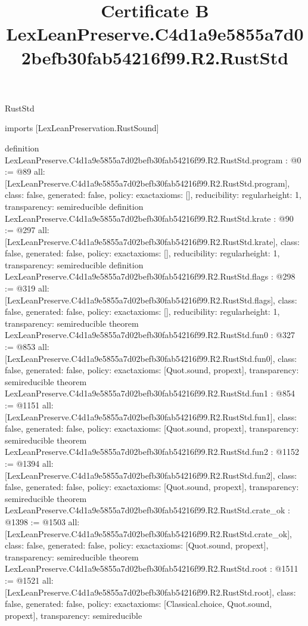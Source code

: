 \begin{lexlean}{RustStd}
\title{Certificate B LexLeanPreserve.C4d1a9e5855a7d02befb30fab54216f99.R2.RustStd}
\begin{coremodule}
imports [LexLeanPreservation.RustSound]

definition LexLeanPreserve.C4d1a9e5855a7d02befb30fab54216f99.R2.RustStd.program : @0 := @89 {
  all: [LexLeanPreserve.C4d1a9e5855a7d02befb30fab54216f99.R2.RustStd.program],
  class: false,
  generated: false,
  policy: exact{axioms: []},
  reducibility: regular{height: 1},
  transparency: semireducible
}
definition LexLeanPreserve.C4d1a9e5855a7d02befb30fab54216f99.R2.RustStd.krate : @90 := @297 {
  all: [LexLeanPreserve.C4d1a9e5855a7d02befb30fab54216f99.R2.RustStd.krate],
  class: false,
  generated: false,
  policy: exact{axioms: []},
  reducibility: regular{height: 1},
  transparency: semireducible
}
definition LexLeanPreserve.C4d1a9e5855a7d02befb30fab54216f99.R2.RustStd.flags : @298 := @319 {
  all: [LexLeanPreserve.C4d1a9e5855a7d02befb30fab54216f99.R2.RustStd.flags],
  class: false,
  generated: false,
  policy: exact{axioms: []},
  reducibility: regular{height: 1},
  transparency: semireducible
}
theorem LexLeanPreserve.C4d1a9e5855a7d02befb30fab54216f99.R2.RustStd.fun0 : @327 := @853 {
  all: [LexLeanPreserve.C4d1a9e5855a7d02befb30fab54216f99.R2.RustStd.fun0],
  class: false,
  generated: false,
  policy: exact{axioms: [Quot.sound, propext]},
  transparency: semireducible
}
theorem LexLeanPreserve.C4d1a9e5855a7d02befb30fab54216f99.R2.RustStd.fun1 : @854 := @1151 {
  all: [LexLeanPreserve.C4d1a9e5855a7d02befb30fab54216f99.R2.RustStd.fun1],
  class: false,
  generated: false,
  policy: exact{axioms: [Quot.sound, propext]},
  transparency: semireducible
}
theorem LexLeanPreserve.C4d1a9e5855a7d02befb30fab54216f99.R2.RustStd.fun2 : @1152 := @1394 {
  all: [LexLeanPreserve.C4d1a9e5855a7d02befb30fab54216f99.R2.RustStd.fun2],
  class: false,
  generated: false,
  policy: exact{axioms: [Quot.sound, propext]},
  transparency: semireducible
}
theorem LexLeanPreserve.C4d1a9e5855a7d02befb30fab54216f99.R2.RustStd.crate_ok : @1398 := @1503 {
  all: [LexLeanPreserve.C4d1a9e5855a7d02befb30fab54216f99.R2.RustStd.crate_ok],
  class: false,
  generated: false,
  policy: exact{axioms: [Quot.sound, propext]},
  transparency: semireducible
}
theorem LexLeanPreserve.C4d1a9e5855a7d02befb30fab54216f99.R2.RustStd.root : @1511 := @1521 {
  all: [LexLeanPreserve.C4d1a9e5855a7d02befb30fab54216f99.R2.RustStd.root],
  class: false,
  generated: false,
  policy: exact{axioms: [Classical.choice, Quot.sound, propext]},
  transparency: semireducible
}


\end{coremodule}
\end{lexlean}
